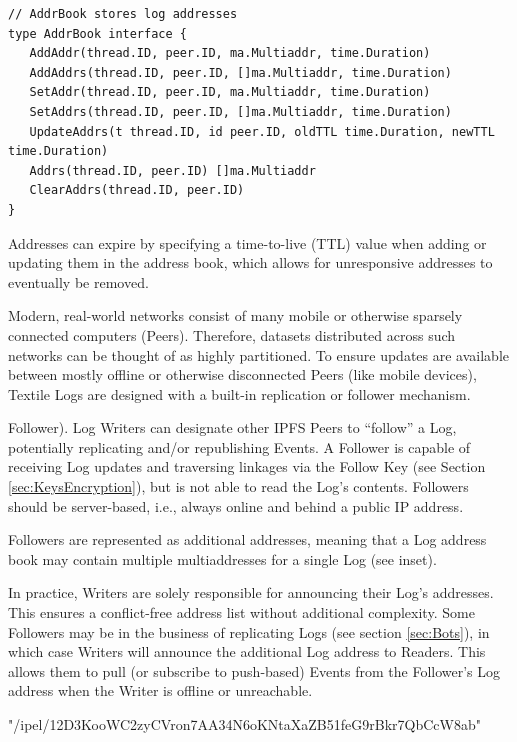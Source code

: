 \documentclass{comjnl}
\begin{document}
\begin{lstlisting}
// AddrBook stores log addresses
type AddrBook interface {
   AddAddr(thread.ID, peer.ID, ma.Multiaddr, time.Duration)
   AddAddrs(thread.ID, peer.ID, []ma.Multiaddr, time.Duration)
   SetAddr(thread.ID, peer.ID, ma.Multiaddr, time.Duration)
   SetAddrs(thread.ID, peer.ID, []ma.Multiaddr, time.Duration)
   UpdateAddrs(t thread.ID, id peer.ID, oldTTL time.Duration, newTTL time.Duration)
   Addrs(thread.ID, peer.ID) []ma.Multiaddr
   ClearAddrs(thread.ID, peer.ID)
}
\end{lstlisting}

Addresses can expire by specifying a time-to-live (TTL) value when adding or updating them in the address book, which allows for unresponsive addresses to eventually be removed.

Modern, real-world networks consist of many mobile or otherwise sparsely connected computers (Peers). Therefore, datasets distributed across such networks can be thought of as highly partitioned. To ensure updates are available between mostly offline or otherwise disconnected Peers (like mobile devices), Textile Logs are designed with a built-in replication or follower mechanism.

\begin{definition}Follower). Log Writers can designate other IPFS Peers to “follow” a Log, potentially replicating and/or republishing Events. A Follower is capable of receiving Log updates and traversing linkages via the Follow Key (see Section  \ref{sec:KeysEncryption}), but is not able to read the Log’s contents. Followers should be server-based, i.e., always online and behind a public IP address.\end{definition}

Followers are represented as additional addresses, meaning that a Log address book may contain multiple multiaddresses for a single Log (see inset).

In practice, Writers are solely responsible for announcing their Log’s addresses. This ensures a conflict-free address list without additional complexity. Some Followers may be in the business of replicating Logs (see section  \ref{sec:Bots}), in which case Writers will announce the additional Log address to Readers. This allows them to pull (or subscribe to push-based) Events from the Follower’s Log address when the Writer is offline or unreachable.

\begin{strip}
\begin{tcolorbox}[title=Log Multiaddress]
"/ipel/12D3KooWC2zyCVron7AA34N6oKNtaXaZB51feG9rBkr7QbCcW8ab"
\end{tcolorbox}
\end{strip}
\end{document}
